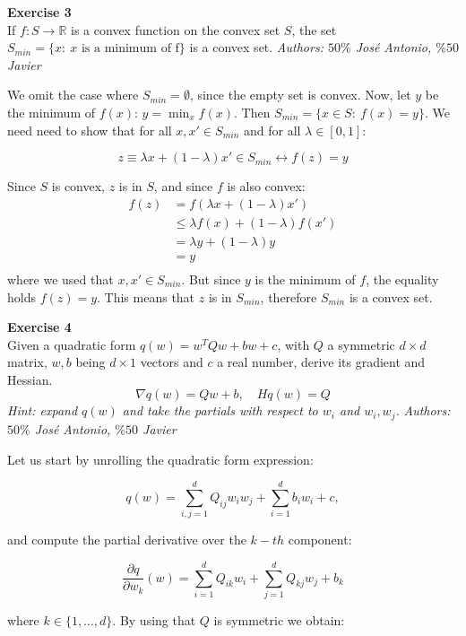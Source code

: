 \documentclass[11pt,table]{article}
\newenvironment{problem}[2][Exercise]
{ \begin{mdframed}[backgroundcolor=gray!20] \textbf{#1 #2} \\}
	{\hspace{0.0cm}\newline\newline \emph{Authors: \(50\%\) José Antonio, \(\%50\) Javier}  \end{mdframed}}
\begin{document}
\begin{problem}{3}
If \( f: S \to \mathbb{R} \) is a convex function on the convex set \( S \), the set \( S_{min} = \{x : \ x \text{ is a minimum of f} \} \) is a convex set.
\end{problem}

We omit the case where \(S_{min} = \emptyset\), since the empty set is convex. Now, let \(y\) be the minimum of \(f(x)\): \(y = \min_x f(x)\). Then \( S_{min} = \{x \in S : \ f(x) = y \} \). We need need to show that for all \(x, x' \in S_{min}\) and for all \(\lambda \in [0,1]\):

\[
	z \equiv \lambda x + (1-\lambda) x' \in S_{min} \leftrightarrow f(z) = y
\]

Since \(S\) is convex, \(z\) is in \(S\), and since \(f\) is also convex:
\begin{align*}
	f(z) & = f\left(\lambda x + (1-\lambda) x'\right) \\
	     & \leq \lambda f(x) + (1-\lambda) f(x')      \\
	     & = \lambda y + (1-\lambda) y                \\
	     & = y                                        \\
\end{align*}
where we used that \(x, x'\in S_{min}\). But since \(y\) is the minimum of \(f\), the equality holds \(f(z) = y\). This means that \(z\) is in \(S_{min}\), therefore \(S_{min}\) is a convex set.

\begin{problem}{4}
Given a quadratic form \( q(w) = w^TQw + bw + c \), with \( Q \) a symmetric \( d\times d \) matrix, \( w,b\) being \(d\times 1 \) vectors and \( c \) a real number, derive its gradient and Hessian.
\[
	\nabla q(w) = Qw + b, \quad Hq(w) = Q
\]
\emph{Hint: expand \(q(w)\) and take the partials with respect to \(w_i\) and \(w_i,w_j\).}
\end{problem}

Let us start by unrolling the quadratic form expression:

\[
	q(w) = \sum_{i,j=1}^{d} Q_{ij} w_{i}w_{j} + \sum_{i=1}^{d}b_{i}w_{i} + c,
\]

and compute the partial derivative over the \(k-th\) component:

\[
	\frac{\partial q}{\partial w_k} (w) = \sum_{i=1}^{d} Q_{ik} w_{i} + \sum_{j=1}^{d} Q_{kj} w_{j} + b_{k}
\]

where \(k \in \{1, \ldots, d\}\). By using that \(Q\) is symmetric we obtain:
\end{document}
